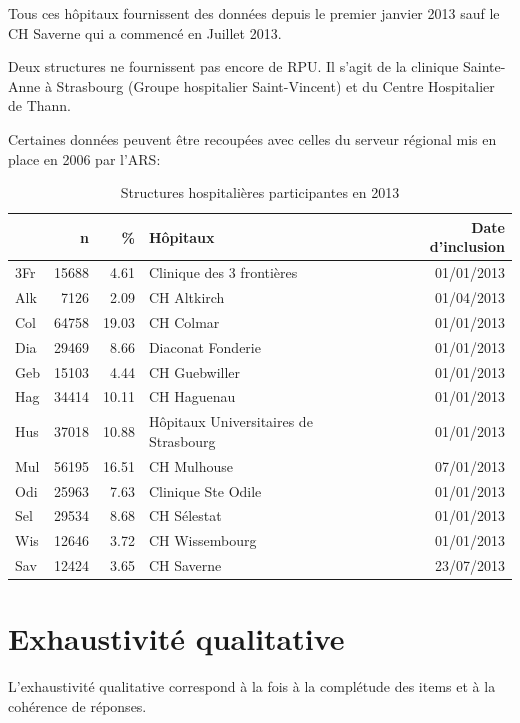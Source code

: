 \documentclass[12pt,english,french,twoside]{book}\usepackage[]{graphicx}\usepackage[]{color}
\begin{document}
Tous ces hôpitaux fournissent des données depuis le premier janvier 2013 sauf le CH Saverne qui a commencé en Juillet 2013.

Deux structures ne fournissent pas encore de RPU. Il s'agit de la clinique Sainte-Anne à Strasbourg (Groupe hospitalier Saint-Vincent) et du Centre Hospitalier de Thann.

Certaines données peuvent être recoupées avec celles du serveur régional mis en place en 2006 par l'ARS: 


\begin{table}[ht]
\centering
\begin{tabular}{|l|r|r|l|r|}
  \hline
 & n & \% & Hôpitaux & Date d'inclusion \\ 
  \hline
3Fr & 15688 & 4.61 & Clinique des 3 frontières & 01/01/2013 \\ 
  Alk & 7126 & 2.09 & CH Altkirch & 01/04/2013 \\ 
  Col & 64758 & 19.03 & CH Colmar & 01/01/2013 \\ 
  Dia & 29469 & 8.66 & Diaconat Fonderie & 01/01/2013 \\ 
  Geb & 15103 & 4.44 & CH Guebwiller & 01/01/2013 \\ 
  Hag & 34414 & 10.11 & CH Haguenau & 01/01/2013 \\ 
  Hus & 37018 & 10.88 & Hôpitaux Universitaires de Strasbourg & 01/01/2013 \\ 
  Mul & 56195 & 16.51 & CH Mulhouse & 07/01/2013 \\ 
  Odi & 25963 & 7.63 & Clinique Ste Odile & 01/01/2013 \\ 
  Sel & 29534 & 8.68 & CH Sélestat & 01/01/2013 \\ 
  Wis & 12646 & 3.72 & CH Wissembourg & 01/01/2013 \\ 
  Sav & 12424 & 3.65 & CH Saverne & 23/07/2013 \\ 
   \hline
\end{tabular}
\caption{Structures hospitalières participantes en 2013} 
\label{tab1}
\end{table}



\section{Exhaustivité qualitative}

L'exhaustivité qualitative correspond à la fois à la complétude des items et à la cohérence de réponses.
\end{document}
